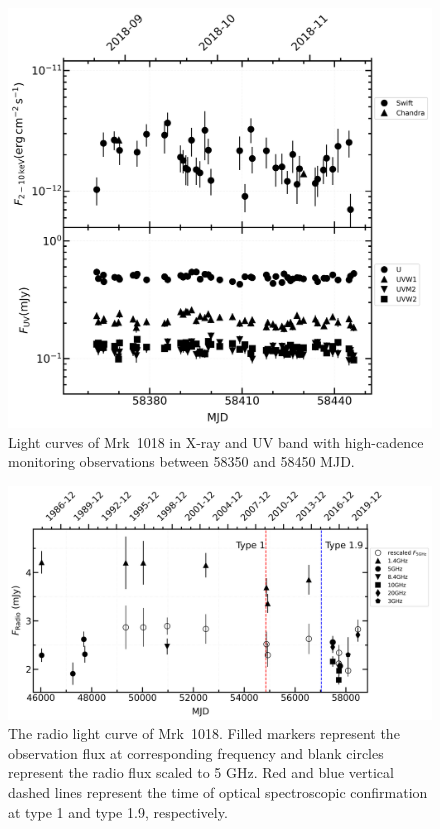 \documentclass[twocolumn]{aastex63}
\begin{document}
\begin{figure}
\centering
	\includegraphics[width=\textwidth]{./pic/subplots-xrt_uvot-radio-second-right-part.png}
    \caption{Light curves of Mrk~1018 in X-ray and UV band with high-cadence monitoring observations between 58350 and 58450 MJD.}
    \label{fig:x-ray-uv-lc-rp-secondaxis}
\end{figure}

\begin{figure}
\centering
	\includegraphics[width=\textwidth]{./pic/subplots-radio-second_freq.png}
    \caption{The radio light curve of Mrk~1018. Filled markers represent the observation flux at corresponding frequency and blank circles represent the radio flux scaled to 5 GHz. Red and blue vertical dashed lines represent the time of optical spectroscopic confirmation at type 1 and type 1.9, respectively.}
    \label{fig:radio-lc}
\end{figure}
\end{document}
